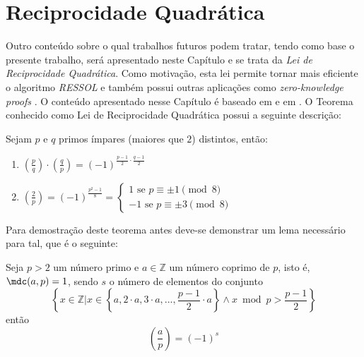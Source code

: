 \chapter{Reciprocidade Quadrática}
\label{cap:reciprocidadequadratica}

Outro conteúdo sobre o qual trabalhos futuros podem tratar, tendo como base o presente trabalho, será apresentado neste Capítulo e se trata da \textit{Lei de Reciprocidade Quadrática}. Como motivação, esta lei permite tornar mais eficiente o algoritmo \textit{RESSOL} \cite{johndcookQuadraticReciprocity} e também possui outras aplicações como \textit{zero-knowledge proofs} \cite{Wright2016}. O conteúdo apresentado nesse Capítulo é baseado em \cite[p.~89-93]{book:2399854} e em \cite{youtuQuadraticReciprocity}.
O Teorema conhecido como Lei de Reciprocidade Quadrática possui a seguinte descrição:

\begin{teorema} Sejam $p$ e $q$ primos ímpares (maiores que $2$) distintos, então:
\label{teorema:reciprocidadequad}
    \begin{enumerate}
        \item \label{item:recipquad1} $\left(\frac{p}{q} \right) \cdot \left(\frac{q}{p} \right) = (-1)^{\frac{p-1}{2} \cdot \frac{q-1}{2}}$

        \item \label{item:recipquad2} $\left(\frac{2}{p} \right) = (-1)^{\frac{p^2 - 1}{8}} = \begin{cases}
                1 \text{ se $p \equiv \pm 1 \pmod{8}$}
                \\
                -1 \text{ se $p \equiv \pm 3 \pmod{8}$}
                \end{cases}$
    \end{enumerate}
    
\end{teorema}
Para demostração deste teorema antes deve-se demonstrar um lema necessário para tal, que é o seguinte:

\begin{lema} \label{lema:gauB}  Seja $p > 2$ um número primo e $a \in \mathbb{Z}$ um número coprimo de $p$, isto é, $\mdc(a, p) = 1$, sendo $s$ o número de elementos do conjunto
\begin{equation*}
    \left\{x \in \mathbb{Z} | x \in \left\{a, 2 \cdot a, 3 \cdot a, ..., \frac{p-1}{2} \cdot a\right\} \land x \bmod p > \frac{p-1}{2} \right\}
\end{equation*}
então
\begin{equation*}
    \left(\frac{a}{p}\right) = (-1)^s
\end{equation*}

\end{lema}

